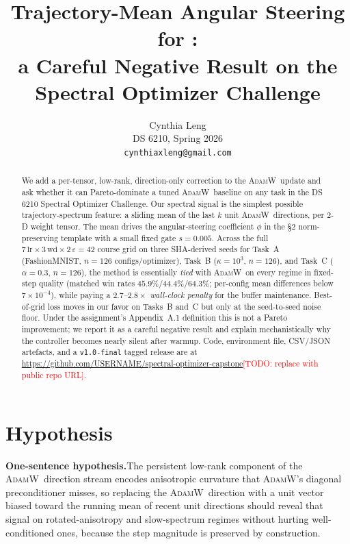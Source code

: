 \documentclass{article}
\title{Trajectory-Mean Angular Steering for \Adamw:\\
       a Careful Negative Result on the Spectral Optimizer Challenge}
\author{%
  Cynthia Leng\\
  DS 6210, Spring 2026\\
  \texttt{cynthiaxleng@gmail.com}
}
\newcommand{\todo}[1]{\textcolor{red}{[TODO: #1]}}
\newcommand{\Adamw}{\textsc{AdamW}}
\begin{document}
\maketitle

\begin{abstract}
We add a per-tensor, low-rank, direction-only correction to the
\Adamw\ update and ask whether it can Pareto-dominate a tuned \Adamw\
baseline on any task in the DS 6210 Spectral Optimizer Challenge.
Our spectral signal is the simplest possible trajectory-spectrum
feature: a sliding mean of the last $k$ unit \Adamw\ directions, per
2-D weight tensor.  The mean drives the angular-steering coefficient
$\phi$ in the §2 norm-preserving template with a small fixed gate
$s = 0.005$.  Across the full
$7\,\text{lr}\!\times\!3\,\text{wd}\!\times\!2\,\varepsilon = 42$
course grid on three SHA-derived seeds for Task~A (FashionMNIST,
$n=126$ configs/optimizer), Task~B ($\kappa=10^3$, $n=126$), and
Task~C ($\alpha=0.3$, $n=126$), the method is essentially \emph{tied}
with \Adamw\ on every regime in fixed-step quality (matched win
rates $45.9\%$/$44.4\%$/$64.3\%$; per-config mean differences below
$7\!\times\!10^{-4}$), while paying a \emph{$2.7$--$2.8\times$
wall-clock penalty} for the buffer maintenance.  Best-of-grid loss
moves in our favor on Tasks~B and~C but only at the seed-to-seed
noise floor.  Under the assignment's Appendix~A.1 definition this is
not a Pareto improvement; we report it as a careful negative result
and explain mechanistically why the controller becomes nearly silent
after warmup.  Code, environment file, CSV/JSON artefacts, and a
\texttt{v1.0-final} tagged release are at
\url{https://github.com/USERNAME/spectral-optimizer-capstone}\todo{replace
with public repo URL}.
\end{abstract}

\section{Hypothesis}

\textbf{One-sentence hypothesis.}\quad The persistent low-rank
component of the \Adamw\ direction stream encodes anisotropic
curvature that \Adamw's diagonal preconditioner misses, so replacing
the \Adamw\ direction with a unit vector biased toward the running
mean of recent unit directions should reveal that signal on
rotated-anisotropy and slow-spectrum regimes without hurting
well-conditioned ones, because the step magnitude is preserved by
construction.
\end{document}
